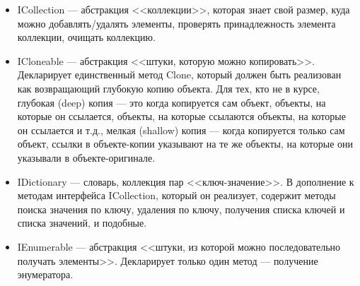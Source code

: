 \documentclass[a5paper]{article}
\begin{document}
\begin{itemize}
    \item ICollection --- абстракция <<коллекции>>, которая знает свой размер, куда можно добавлять/удалять элементы, проверять принадлежность элемента коллекции, очищать коллекцию.
    \item ICloneable --- абстракция <<штуки, которую можно копировать>>. Декларирует единственный метод Clone, который должен быть реализован как возвращающий глубокую копию объекта. Для тех, кто не в курсе, глубокая (deep) копия --- это когда копируется сам объект, объекты, на которые он ссылается, объекты, на которые ссылаются объекты, на которые он ссылается и т.д., мелкая (shallow) копия --- когда копируется только сам объект, ссылки в объекте-копии указывают на те же объекты, на которые они указывали в объекте-оригинале.
    \item IDictionary --- словарь, коллекция пар <<ключ-значение>>. В дополнение к методам интерфейса ICollection, который он реализует, содержит методы поиска значения по ключу, удаления по ключу, получения списка ключей и списка значений, и подобные.
    \item IEnumerable --- абстракция <<штуки, из которой можно последовательно получать элементы>>. Декларирует только один метод --- получение энумератора.

\end{itemize}
\end{document}
